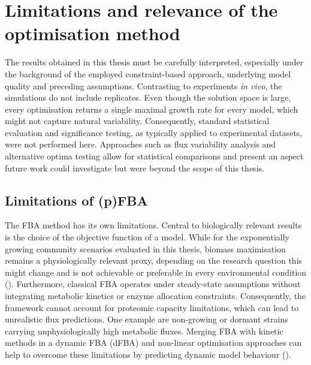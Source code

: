 \section{Limitations and relevance of the optimisation method} 
The results obtained in this thesis must be carefully interpreted, especially under the background of the employed constraint-based approach, underlying model quality and preceding assumptions. Contrasting to experiments \textit{in vivo}, the simulations do not include replicates. Even though the solution space is large, every optimisation returns a single maximal growth rate for every model, which might not capture natural variability. Consequently, standard statistical evaluation and significance testing, as typically applied to experimental datasets, were not performed here. Approaches such as flux variability analysis and alternative optima testing allow for statistical comparisons and present an aspect future work could investigate but were beyond the scope of this thesis.

\subsection{Limitations of (p)FBA}
The FBA method has its own limitations. Central to biologically relevant results is the choice of the objective function of a model. While for the exponentially growing community scenarios evaluated in this thesis, biomass maximisation remains a physiologically relevant proxy, depending on the research question this might change and is not achievable or preferable in every environmental condition (\cite{raman_flux_2009, schuetz_systematic_2007}). Furthermore, classical FBA operates under steady-state assumptions without integrating metabolic kinetics or enzyme allocation constraints. Consequently, the framework cannot account for proteomic capacity limitations, which can lead to unrealistic flux predictions. One example are non-growing or dormant strains carrying unphysiologically high metabolic fluxes. Merging FBA with kinetic methods in a dynamic FBA (dFBA) and non-linear optimisation approaches can help to overcome these limitations by predicting dynamic model behaviour (\cite{de_oliveira_nonlinear_2023, mahadevan_dynamic_2002}).

